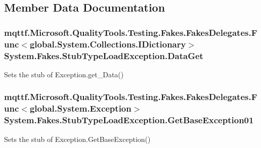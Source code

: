 \subsection{Member Data Documentation}
\hypertarget{class_system_1_1_fakes_1_1_stub_type_load_exception_aca3ef23980b1974931d1a931bcc0370e}{
\subsubsection[{Data\-Get}]{\setlength{\rightskip}{0pt plus 5cm}mqttf.\-Microsoft.\-Quality\-Tools.\-Testing.\-Fakes.\-Fakes\-Delegates.\-Func$<$global.\-System.\-Collections.\-I\-Dictionary$>$ System.\-Fakes.\-Stub\-Type\-Load\-Exception.\-Data\-Get}}\label{class_system_1_1_fakes_1_1_stub_type_load_exception_aca3ef23980b1974931d1a931bcc0370e}


Sets the stub of Exception.\-get\-\_\-\-Data()

\hypertarget{class_system_1_1_fakes_1_1_stub_type_load_exception_afe7f9214162a25e495f7d937374c573c}{
\subsubsection[{Get\-Base\-Exception01}]{\setlength{\rightskip}{0pt plus 5cm}mqttf.\-Microsoft.\-Quality\-Tools.\-Testing.\-Fakes.\-Fakes\-Delegates.\-Func$<$global.\-System.\-Exception$>$ System.\-Fakes.\-Stub\-Type\-Load\-Exception.\-Get\-Base\-Exception01}}\label{class_system_1_1_fakes_1_1_stub_type_load_exception_afe7f9214162a25e495f7d937374c573c}


Sets the stub of Exception.\-Get\-Base\-Exception()

